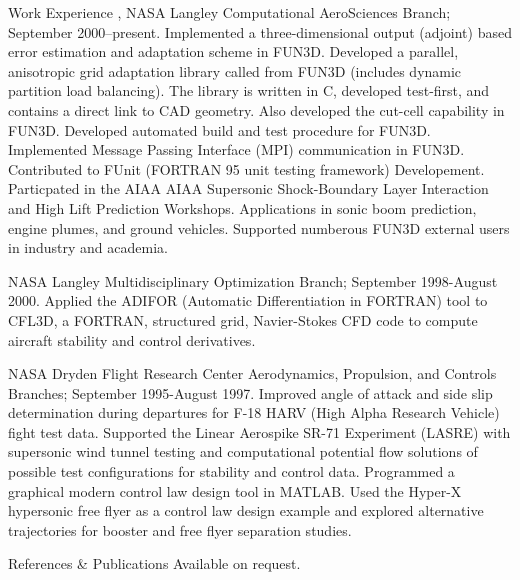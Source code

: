 \documentclass{resume}
\begin{document}
\begin{category}{Work Experience}
, NASA Langley Computational AeroSciences Branch;
September 2000--present.
Implemented a three-dimensional output (adjoint) based error
estimation and adaptation scheme in FUN3D. 
Developed a parallel, anisotropic grid adaptation
library called from FUN3D (includes dynamic partition load balancing).
The library is
written in C, developed test-first, and contains a direct link to CAD geometry.
Also developed the cut-cell capability in FUN3D.
Developed automated build and test procedure for FUN3D.
Implemented Message Passing Interface (MPI) communication in FUN3D.
Contributed to FUnit (FORTRAN 95 unit testing framework) Developement.
Particpated in the AIAA AIAA Supersonic Shock-Boundary Layer Interaction and High Lift Prediction Workshops.
Applications in sonic boom prediction, engine plumes, and ground vehicles.
Supported numberous FUN3D external users in industry and academia.

 NASA Langley Multidisciplinary Optimization Branch;
 September 1998­-August 2000.
Applied the ADIFOR (Automatic Differentiation in FORTRAN) tool to
CFL3D, a FORTRAN, structured grid, Navier-Stokes CFD code to compute
aircraft stability and control derivatives.

NASA Dryden Flight Research Center Aerodynamics, Propulsion, and Controls
Branches; September 1995-­August 1997. 
Improved angle of attack and
side slip determination during departures for F-18 HARV (High Alpha
Research Vehicle) fight test data. Supported the Linear Aerospike
SR-71 Experiment (LASRE) with supersonic wind tunnel testing and
computational potential flow solutions of possible test configurations
for stability and control data. Programmed a graphical modern control
law design tool in MATLAB. Used the Hyper-X hypersonic free flyer as a
control law design example and explored alternative trajectories for
booster and free flyer separation studies.


\end{category}


\begin{category}{References \& Publications} 
\citemnobullet Available on request.
\end{category}
\end{document}

